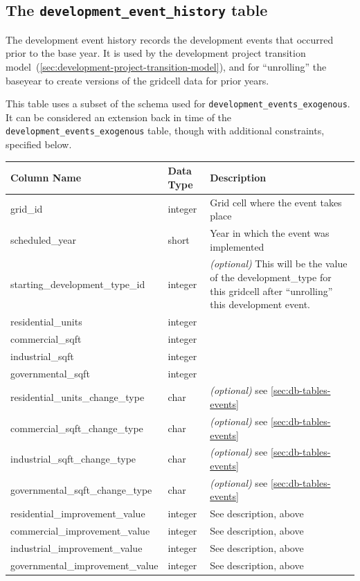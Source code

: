 \subsection{The {\tt development_event_history} table}
\label{sec:table-development-event-history}

The development event history records the development events that occurred
prior to the base year. It is used by the development project transition model~(\ref{sec:development-project-transition-model}),
and for ``unrolling'' the baseyear to create versions of the gridcell data for
prior years.

This table uses a subset of the schema used for
\verb|development_events_exogenous|.  It
can be considered an extension back in time of the \verb|development_events_exogenous|
table, though with additional constraints, specified below.

\begin{tabular}{|p{2in}|l|p{3.5in}|}
\hline
\textbf{Column Name} & \textbf{Data Type} & \textbf{Description} \\
\hline
grid_id & integer & Grid cell where the event takes place  \\
\hline
scheduled_year &short & Year in which the event was implemented  \\
\hline
starting_development_type_id & integer & \emph{(optional) }
This will be the value of the development_type for this gridcell after
``unrolling'' this development event. \\
\hline
residential_units & integer & \\
\hline
commercial_sqft & integer & \\
\hline
industrial_sqft & integer & \\
\hline
governmental_sqft & integer & \\
\hline
residential_units_change_type & char & \emph{(optional) } see \ref{sec:db-tables-events}\\
\hline
commercial_sqft_change_type & char & \emph{(optional) } see \ref{sec:db-tables-events}\\
\hline
industrial_sqft_change_type & char & \emph{(optional) } see \ref{sec:db-tables-events}\\
\hline
governmental_sqft_change_type & char & \emph{(optional) } see \ref{sec:db-tables-events}\\
\hline
residential_improvement_value & integer & See description, above  \\
\hline
commercial_improvement_value & integer & See description, above  \\
\hline
industrial_improvement_value & integer & See description, above  \\
\hline
governmental_improvement_value & integer & See description, above  \\
\hline

\end{tabular}

